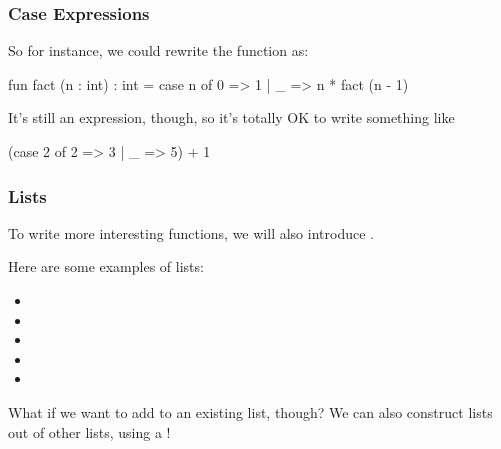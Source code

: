 \documentclass[aspectratio=169]{beamer}
\begin{document}
\begin{frame}[fragile]
  \frametitle{Case Expressions}
  So for instance, we could rewrite the  function as:

  \begin{codeblock}
    fun fact (n : int) : int =
      case n of
        0 => 1
      | _ => n * fact (n - 1)
  \end{codeblock}

  \pause
  \vspace{\fill}


  \pause
  \vspace{\fill}

  It's still an expression, though, so it's totally OK to write something like
  \begin{codeblock}
    (case 2 of
      2 => 3
    | _ => 5) + 1
  \end{codeblock}
\end{frame}

\begin{frame}[fragile]
  \frametitle{Lists}

  To write more interesting functions, we will also introduce .

  \pause
  \vspace{\fill}


  \pause
  \vspace{\fill}

  Here are some examples of lists:
  \begin{itemize}
    \item {}
    \item {}
    \item {}
    \item {}
    \item {}
  \end{itemize}

  \pause
  \vspace{\fill}

  What if we want to add to an existing list, though? We can also construct lists out of other lists, using a !
\end{frame}
\end{document}
